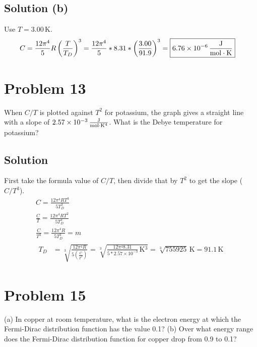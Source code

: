 \documentclass[12pt]{article}
\newcommand{\E}[1]{\times 10^{#1}}
\begin{document}
    \subsection{Solution (b)}
        Use $T = 3.00\,\unit{\kelvin}$.
        \begin{align}
            C   &=  \frac{12\pi^4}{5}R\left( \frac{T}{T_D} \right)^3
                =   \frac{12\pi^4}{5} * 8.31 * \left( \frac{3.00}{91.9} \right)^3
                =   \boxed{6.76\E{-6}\,\unit{\frac{\joule}{\mole\cdot\kelvin}}}
        \end{align}
    \pagebreak

\section{Problem 13}
    When $C/T$ is plotted against $T^2$ for potassium, the graph gives a straight line with a slope of $2.57\E{-3}\,\unit{\frac{\joule}{\mole\cdot\kelvin^4}}$.
    What is the Debye temperature for potassium?

    \subsection{Solution}
        First take the formula value of $C/T$, then divide that by $T^2$ to get the slope ($C/T^3$).
        \begin{gather}
            C = \frac{12\pi^4 R T^3}{5 T_D^3}\\
            \frac{C}{T} = \frac{12\pi^4 R T^2}{5 T_D^3}\\
            \frac{C}{T^3} = \frac{12\pi^4 R}{5 T_D^3} = m\\
            \begin{align}
                T_D &=  \sqrt[3]{\frac{12\pi^4 R}{5 \left( \frac{C}{T^3} \right)}}
                    =   \sqrt[3]{\frac{12\pi^4 8.31}{5 * 2.57\E{-3}}\,\unit{\kelvin^3}}
                    =   \sqrt[3]{755925}\,\unit{\kelvin}
                    =   \boxed{91.1\,\unit{\kelvin}}
            \end{align}
        \end{gather}
    \pagebreak

\section{Problem 15} %
    (a) In copper at room temperature, what is the electron energy at which the Fermi-Dirac distribution function has the value 0.1? 
    (b) Over what energy range does the Fermi-Dirac distribution function for copper drop from 0.9 to 0.1?
\end{document}
